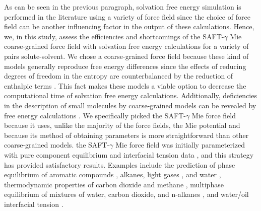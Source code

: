 \documentclass[final,12p,times,twocolumn]{elsarticle}
\begin{document}
	As can be seen in the previous paragraph, solvation free energy simulation is performed in the literature using a variety of force field since the choice of force field can be another influencing factor in the output of these calculations. Hence, we, in this study, assess the efficiencies and shortcomings of the SAFT-$\gamma$ Mie coarse-grained force field  \cite{avendano2011} with solvation free energy calculations for a variety of pairs solute-solvent. We chose a coarse-grained force field because these kind of models generally reproduce free energy differences since the effects of reducing degrees of freedom in the entropy are counterbalanced by the reduction of enthalpic terms \cite{kmiecik2016}. This fact makes these models a viable option to decrease the computational time of solvation free energy calculations. Additionally, deficiencies in the description of small molecules by coarse-grained models can be revealed by free energy calculations \cite{mobley2007,shirts2013}. We specifically picked  the SAFT-$\gamma$ Mie force field because it uses, unlike the majority of the force fields, the Mie potential and because its method of obtaining parameters is more straightforward than other coarse-grained models. the SAFT-$\gamma$ Mie force field was initially parameterized with pure component equilibrium and interfacial tension data \cite{avendano2011}, and this strategy has provided satisfactory results. Examples include the prediction of phase equilibrium of aromatic compounds \cite{muller2017}, alkanes, light gases \cite{herdes2015}, and water \cite{lobanova2015}, thermodynamic properties of carbon dioxide and methane \cite{cassiano1}, multiphase equilibrium of mixtures of water, carbon dioxide, and n-alkanes \cite{lobanova2016}, and water/oil interfacial tension \cite{herdes2017}.
	
\end{document}
